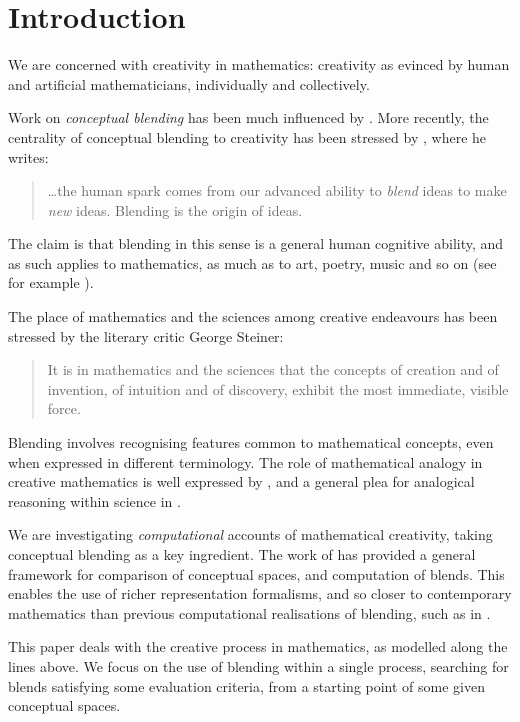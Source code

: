 \section{Introduction}
\label{sec:intro}

We are concerned with creativity in mathematics: creativity
as evinced by human and artificial mathematicians,
individually and collectively.

Work on \emph{conceptual blending} has been much influenced
by \textcite{Fau98}.
More recently, the centrality of conceptual blending to creativity
has been stressed by \textcite{MTurner14}, where he writes:
\begin{quote}
  \dots the human spark comes from our advanced ability to \emph{blend} ideas
  to make \emph{new} ideas. Blending is the origin of ideas.%
  \hfill \parencite[p 2]{MTurner14}
\end{quote}
The claim is that blending in this sense is a general human cognitive
ability, and as such applies to mathematics, as much as to art, poetry,
music and so on (see for example \textcite{MTurner05}).

The place of mathematics and the sciences among creative endeavours
has been stressed by the literary critic George Steiner:
\begin{quote}
  It is in mathematics and the sciences that the concepts of
creation and of invention, of intuition and of discovery,
exhibit the most immediate, visible force.
\end{quote}
Blending involves recognising features common
to mathematical concepts, even when expressed in different
terminology.  The role of mathematical analogy in creative mathematics
is well expressed by \textcite{Weil60}, and a general plea for
analogical reasoning within science in \cite{ArbibHesse86}.

We are investigating \emph{computational} accounts of mathematical
creativity, taking conceptual blending as a key ingredient.  The work
of \textcite{Gog99,Gog05b} 
has provided a general framework for
comparison of conceptual spaces, and computation of blends.  This
enables the use of richer representation formalisms, and so closer to
contemporary mathematics than previous computational realisations of
blending, such as in \textcite{Pereira2007}.

This paper deals with the creative process in mathematics, as modelled
along the lines above. We focus on the use of blending within a single
process, searching for blends satisfying some evaluation criteria,
from a starting point of some given conceptual spaces.

